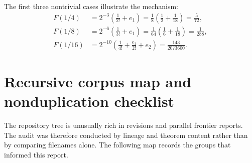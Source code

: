 \documentclass[11pt]{article}
\theoremstyle{definition}
\theoremstyle{remark}
\begin{document}
The first three nontrivial cases illustrate the mechanism:
\begin{align}
 F(1/4)
 &=2^{-3}\left(\frac1{2!}+e_1\right)
 =\frac18\left(\frac12+\frac1{18}\right)=\frac5{72},
 \label{p4:eq:case-n2}\\
 F(1/8)
 &=2^{-6}\left(\frac1{3!}+e_1\right)
 =\frac1{64}\left(\frac16+\frac1{18}\right)=\frac1{288},
 \label{p4:eq:case-n3}\\
 F(1/16)
 &=2^{-10}\left(\frac1{4!}+\frac{e_1}{2!}+e_2\right)
 =\frac{143}{2073600}.
 \label{p4:eq:case-n4}
\end{align}

\section{Recursive corpus map and nonduplication checklist}
\label{p4:app:corpus}

The repository tree is unusually rich in revisions and parallel frontier reports.  The
audit was therefore conducted by lineage and theorem content rather than by comparing
filenames alone.  The following map records the groups that informed this report.
\end{document}
